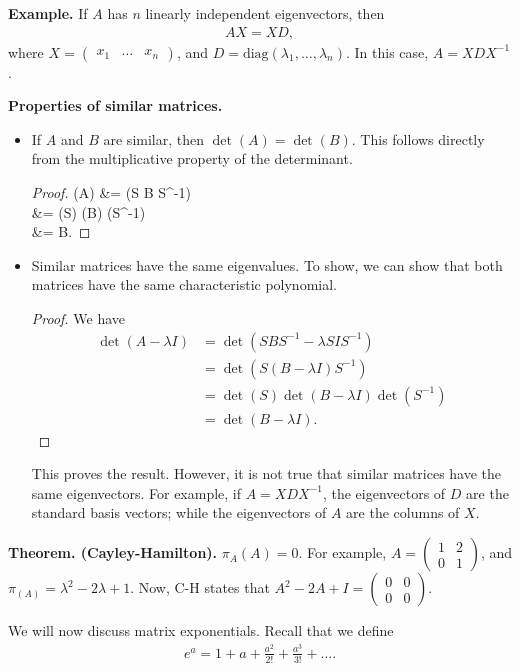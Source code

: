 \documentclass{article}
\newcommand{\mat}[1]{\begin{pmatrix}#1\end{pmatrix}}
\begin{document}
{\bf Example.} If $A$ has $n$ linearly independent eigenvectors, then
\begin{align*}
  AX = XD,
\end{align*}
where $X = \mat{x_1 & \dots & x_n}$, and $D = \text{diag}(\lambda_1, \dots, \lambda_n)$.  In this case, $A = X D X^{-1}$.

{\bf Properties of similar matrices.}

\begin{itemize}
  \item If $A$ and $B$ are similar, then $\det (A) = \det (B)$.  This follows directly from the multiplicative property of the determinant.

    \begin{proof}
      \det (A) &= \det (S B S^{-1}) \\
      &= \det (S) \det (B) \det (S^{-1}) \\
      &= \det B.
    \end{proof}

  \item Similar matrices have the same eigenvalues.  To show, we can show that both matrices have the same characteristic polynomial.  

    \begin{proof}
      We have
      \begin{align*}
        \det(A - \lambda I) &= \det (S B S^{-1} - \lambda S I S^{-1}) \\
        &= \det (S (B - \lambda I) S^{-1} ) \\
        &= \det (S) \det (B - \lambda I) \det (S^{-1}) \\
        &= \det (B - \lambda I).
      \end{align*}
    \end{proof}

    This proves the result.  However, it is not true that similar matrices have the same eigenvectors.  For example, if $A = X D X^{-1}$, the eigenvectors of $D$ are the standard basis vectors; while the eigenvectors of $A$ are the columns of $X$.
\end{itemize}


   {\bf Theorem. (Cayley-Hamilton).} $\pi_{A} (A) = 0$. For example, $A = \mat{1 & 2 \\ 0 & 1}$, and $\pi_(A) = \lambda^2 - 2 \lambda + 1$.  Now, C-H states that $A^2 - 2A + I = \mat{0 & 0 \\ 0 & 0}$.

We will now discuss matrix exponentials.  Recall that we define
\begin{align*}
  e^a = 1 + a + \frac{a^2}{2!} + \frac{a^3}{3!} + \dots.
\end{align*}
\end{document}
